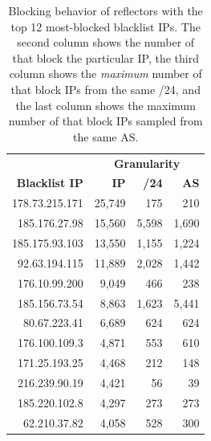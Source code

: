 \begin{table}[t]
\centering
\small
\begin{tabular}{r  r  r  r}
 \toprule
                         & \multicolumn{3}{c}{\textbf{Granularity}} \\
 \textbf{Blacklist IP}   & \textbf{IP}  & \textbf{/24}   & \textbf{AS}\\
 \midrule
 178.73.215.171             & 25,749                 & 175        & 210     \\
 185.176.27.98              & 15,560                 & 5,598      & 1,690   \\
 185.175.93.103             & 13,550                 & 1,155      & 1,224   \\
 92.63.194.115              & 11,889                 & 2,028      & 1,442   \\
 176.10.99.200              & 9,049                  & 466        & 238     \\
 185.156.73.54              & 8,863                  & 1,623      & 5,441   \\
 80.67.223.41               & 6,689                  & 624       & 624      \\
 176.100.109.3              & 4,871                  & 553       & 610      \\
 171.25.193.25              & 4,468                  & 212       & 148      \\
 216.239.90.19              & 4,421                  & 56        & 39       \\
 185.220.102.8              & 4,297                  & 273       & 273      \\
 62.210.37.82               & 4,058                  & 528       & 300      \\
 \bottomrule
\end{tabular}
\caption{Blocking behavior of reflectors with the top 12 most-blocked
  blacklist IPs.  The second column shows the number of {}
  that block the particular IP, the third column shows the
  \textit{maximum} number of {} that block IPs from the
  same /24, and the last column shows the maximum number of
  {} that block IPs sampled from the same AS.}
\label{tab:super-malicious-ips}
\end{table}


